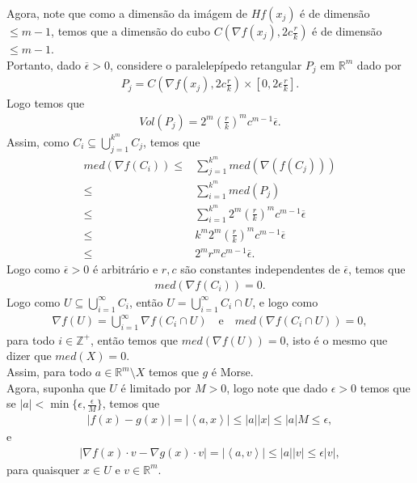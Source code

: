 \begin{homeworkProblem}[Seção 2-7]
\begin{solution}
    Agora, note que como a dimensão da imágem de $Hf(x_j)$ é de dimensão $\leq m-1$, temos que a dimensão do cubo $C(\nabla f(x_j),2c\frac{r}{k})$ é de dimensão $\leq m-1$.\\
    Portanto, dado $\overline{\epsilon}>0$, considere o paralelepípedo retangular $P_j$ em $\mathbb{R}^{m}$ dado por
    \begin{align*}
      P_{j}=C\left(\nabla f(x_j),2c\frac{r}{k}\right)\times \left[0,2\epsilon \frac{r}{k}\right].
    \end{align*}
    Logo temos que
    \begin{align*}
      Vol(P_j)=2^{m}\left( \frac{r}{k} \right)^{m}c^{m-1}\overline{\epsilon}.
    \end{align*}
    Assim, como $C_i\subseteq \bigcup_{j=1}^{k^{m}}C_j$, temos que
    \begin{align*}
      med(\nabla f(C_i))\leq&\sum_{j=1}^{k^{m}}med(\nabla(f(C_j)))\\
      \leq&\sum_{i=1}^{k^{m}}med(P_j)\\
      \leq&\sum_{i=1}^{k^{m}}2^{m}\left( \frac{r}{k} \right)^{m}c^{m-1}\overline{\epsilon}\\
      \leq& k^{m}2^{m}\left( \frac{r}{k} \right)^{m}c^{m-1}\overline{\epsilon}\\
      \leq& 2^{m}r^{m}c^{m-1}\overline{\epsilon}.
    \end{align*}
    Logo como $\overline{\epsilon}>0$ é arbitrário e $r,c$ são constantes independentes de $\overline{\epsilon}$, temos que
    \begin{align*}
      med(\nabla f(C_i))=0.
    \end{align*}
    Logo como $U\subseteq \bigcup_{i=1}^{\infty}C_i$, então $U=\bigcup_{i=1}^{\infty}C_i\cap U$, e logo como
    \begin{align*}
      \nabla f(U)=\bigcup_{i=1}^{\infty}\nabla f(C_i\cap U)\quad\text{e}\quad med(\nabla f(C_i\cap U))=0,
    \end{align*}
    para todo $i\in\mathbb{Z}^{+}$, então temos que $med(\nabla f(U))=0$, isto é o mesmo que dizer que $med(X)=0$.\\
    Assim, para todo $a\in\mathbb{R}^{m}\setminus X$ temos que $g$ é Morse.\\
    Agora, suponha que $U$ é limitado por $M>0$, logo note que dado $\epsilon>0$ temos que se $|a|<\min\{\epsilon,\frac{\epsilon}{M}\}$, temos que
    \begin{align*}
      |f(x)-g(x)|=|\left\langle a,x \right\rangle|\leq|a||x|\leq |a|M\leq \epsilon,
    \end{align*}
    e
    \begin{align*}
      |\nabla f(x)\cdot v-\nabla g(x)\cdot v|=|\left\langle a,v \right\rangle|\leq |a||v|\leq \epsilon |v|,
    \end{align*}
    para quaisquer $x\in U$ e $v\in\mathbb{R}^{m}$. 
  \end{solution}
\end{homeworkProblem}
